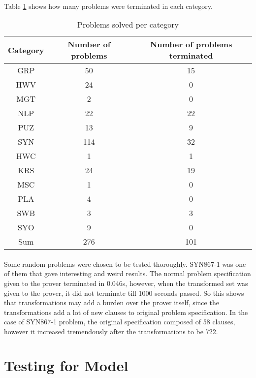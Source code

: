 \paragraph{}
Table \ref{table:category_solved} shows how many problems were terminated in each category.
\begin{table}[H]
	\centering
	\begin{tabular}{|| c | c | c ||}
		\toprule
		Category & Number of problems & Number of problems terminated \\
		\midrule
		GRP & 50 & 15 \\
		HWV & 24 & 0 \\
		MGT & 2 & 0 \\
		NLP & 22 & 22 \\
		PUZ & 13 & 9 \\
		SYN & 114 & 32 \\
		HWC & 1 & 1 \\
		KRS & 24 & 19 \\
		MSC & 1 & 0 \\
		PLA & 4 & 0 \\
		SWB & 3 & 3 \\
		SYO & 9 & 0 \\
		\midrule
		Sum & 276 & 101 \\ 
		\bottomrule
	\end{tabular}
	\caption{Problems solved per category}
	\label{table:category_solved}
\end{table}

\paragraph{}
Some random problems were chosen to be tested thoroughly. SYN867-1 was one of them that gave interesting and weird results. The normal problem specification given to the prover terminated in 0.046s, however, when the transformed set was given to the prover, it did not terminate till 1000 seconds passed. So this shows that transformations may add a burden over the prover itself, since the transformations add a lot of new clauses to original problem specification. In the case of SYN867-1 problem, the original specification composed of 58 clauses, however it increased tremendously after the transformations to be 722.



\section{Testing for Model}\label{sec:test_model}
